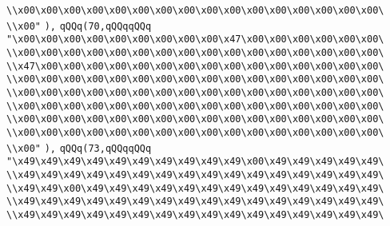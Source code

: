 \verb|\\x00\x00\x00\x00\x00\x00\x00\x00\x00\x00\x00\x00\x00\x00\x00\x00\|\newline
\verb|\\x00"|\newline
\verb|),|\newline
\verb|qQQq(70,qQQqqQQq|\newline
\verb|"\x00\x00\x00\x00\x00\x00\x00\x00\x00\x47\x00\x00\x00\x00\x00\x00\|\newline
\verb|\\x00\x00\x00\x00\x00\x00\x00\x00\x00\x00\x00\x00\x00\x00\x00\x00\|\newline
\verb|\\x47\x00\x00\x00\x00\x00\x00\x00\x00\x00\x00\x00\x00\x00\x00\x00\|\newline
\verb|\\x00\x00\x00\x00\x00\x00\x00\x00\x00\x00\x00\x00\x00\x00\x00\x00\|\newline
\verb|\\x00\x00\x00\x00\x00\x00\x00\x00\x00\x00\x00\x00\x00\x00\x00\x00\|\newline
\verb|\\x00\x00\x00\x00\x00\x00\x00\x00\x00\x00\x00\x00\x00\x00\x00\x00\|\newline
\verb|\\x00\x00\x00\x00\x00\x00\x00\x00\x00\x00\x00\x00\x00\x00\x00\x00\|\newline
\verb|\\x00\x00\x00\x00\x00\x00\x00\x00\x00\x00\x00\x00\x00\x00\x00\x00\|\newline
\verb|\\x00"|\newline
\verb|),|\newline
\verb|qQQq(73,qQQqqQQq|\newline
\verb|"\x49\x49\x49\x49\x49\x49\x49\x49\x49\x49\x00\x49\x49\x49\x49\x49\|\newline
\verb|\\x49\x49\x49\x49\x49\x49\x49\x49\x49\x49\x49\x49\x49\x49\x49\x49\|\newline
\verb|\\x49\x49\x00\x49\x49\x49\x49\x49\x49\x49\x49\x49\x49\x49\x49\x49\|\newline
\verb|\\x49\x49\x49\x49\x49\x49\x49\x49\x49\x49\x49\x49\x49\x49\x49\x49\|\newline
\verb|\\x49\x49\x49\x49\x49\x49\x49\x49\x49\x49\x49\x49\x49\x49\x49\x49\|\newline
